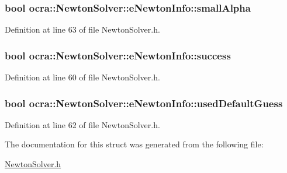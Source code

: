 \subsubsection[{\texorpdfstring{small\+Alpha}{smallAlpha}}]{\setlength{\rightskip}{0pt plus 5cm}bool ocra\+::\+Newton\+Solver\+::e\+Newton\+Info\+::small\+Alpha}\hypertarget{structocra_1_1NewtonSolver_1_1eNewtonInfo_a034b326acca364d57a7bdeea79849625}{}\label{structocra_1_1NewtonSolver_1_1eNewtonInfo_a034b326acca364d57a7bdeea79849625}


Definition at line 63 of file Newton\+Solver.\+h.

\subsubsection[{\texorpdfstring{success}{success}}]{\setlength{\rightskip}{0pt plus 5cm}bool ocra\+::\+Newton\+Solver\+::e\+Newton\+Info\+::success}\hypertarget{structocra_1_1NewtonSolver_1_1eNewtonInfo_ad3fb93c95fbe6e760caffc64fa1739cb}{}\label{structocra_1_1NewtonSolver_1_1eNewtonInfo_ad3fb93c95fbe6e760caffc64fa1739cb}


Definition at line 60 of file Newton\+Solver.\+h.

\subsubsection[{\texorpdfstring{used\+Default\+Guess}{usedDefaultGuess}}]{\setlength{\rightskip}{0pt plus 5cm}bool ocra\+::\+Newton\+Solver\+::e\+Newton\+Info\+::used\+Default\+Guess}\hypertarget{structocra_1_1NewtonSolver_1_1eNewtonInfo_a210ebc2859be22918cc378fc16a5cf88}{}\label{structocra_1_1NewtonSolver_1_1eNewtonInfo_a210ebc2859be22918cc378fc16a5cf88}


Definition at line 62 of file Newton\+Solver.\+h.



The documentation for this struct was generated from the following file\+:\begin{DoxyCompactItemize}
\item 
\hyperlink{NewtonSolver_8h}{Newton\+Solver.\+h}\end{DoxyCompactItemize}
